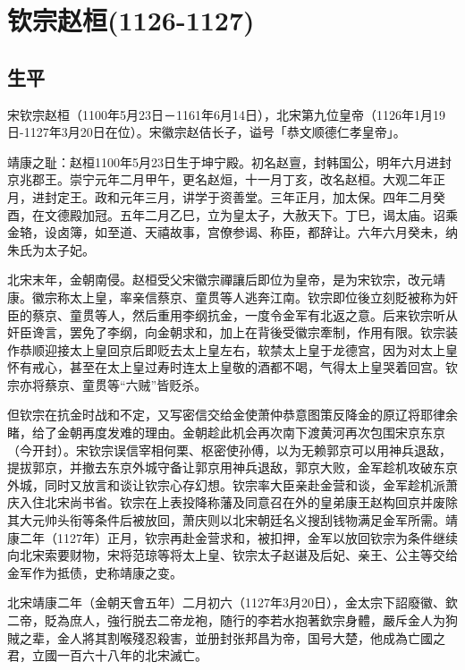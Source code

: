 
\section{钦宗赵桓\tiny(1126-1127)}

\subsection{生平}

宋钦宗赵桓（1100年5月23日－1161年6月14日），北宋第九位皇帝（1126年1月19日-1127年3月20日在位）。宋徽宗赵佶长子，谥号「恭文顺德仁孝皇帝」。

靖康之耻：赵桓1100年5月23日生于坤宁殿。初名赵亶，封韩国公，明年六月进封京兆郡王。崇宁元年二月甲午，更名赵烜，十一月丁亥，改名赵桓。大观二年正月，进封定王。政和元年三月，讲学于资善堂。三年正月，加太保。四年二月癸酉，在文德殿加冠。五年二月乙巳，立为皇太子，大赦天下。丁巳，谒太庙。诏乘金辂，设卤簿，如至道、天禧故事，宫僚参谒、称臣，都辞让。六年六月癸未，纳朱氏为太子妃。

北宋末年，金朝南侵。赵桓受父宋徽宗禪讓后即位为皇帝，是为宋钦宗，改元靖康。徽宗称太上皇，率亲信蔡京、童贯等人逃奔江南。钦宗即位後立刻貶被称为奸臣的蔡京、童贯等人，然后重用李纲抗金，一度令金军有北返之意。后来钦宗听从奸臣谗言，罢免了李纲，向金朝求和，加上在背後受徽宗牽制，作用有限。钦宗装作恭顺迎接太上皇回京后即贬去太上皇左右，软禁太上皇于龙德宫，因为对太上皇怀有戒心，甚至在太上皇过寿时连太上皇敬的酒都不喝，气得太上皇哭着回宫。钦宗亦将蔡京、童贯等“六贼”皆贬杀。

但钦宗在抗金时战和不定，又写密信交给金使萧仲恭意图策反降金的原辽将耶律余睹，给了金朝再度发难的理由。金朝趁此机会再次南下渡黄河再次包围宋京东京（今开封）。宋钦宗误信宰相何栗、枢密使孙傅，以为无赖郭京可以用神兵退敌，提拔郭京，并撤去东京外城守备让郭京用神兵退敌，郭京大败，金军趁机攻破东京外城，同时又放言和谈让钦宗心存幻想。钦宗率大臣亲赴金营和谈，金军趁机派萧庆入住北宋尚书省。钦宗在上表投降称藩及同意召在外的皇弟康王赵构回京并废除其大元帅头衔等条件后被放回，萧庆则以北宋朝廷名义搜刮钱物满足金军所需。靖康二年（1127年）正月，钦宗再赴金营求和，被扣押，金军以放回钦宗为条件继续向北宋索要财物，宋将范琼等将太上皇、钦宗太子赵谌及后妃、亲王、公主等交给金军作为抵债，史称靖康之变。

北宋靖康二年（金朝天會五年）二月初六（1127年3月20日），金太宗下詔廢徽、欽二帝，貶為庶人，強行脱去二帝龙袍，随行的李若水抱著欽宗身體，嚴斥金人为狗賊之辈，金人將其割喉殘忍殺害，並册封张邦昌为帝，国号大楚，他成為亡國之君，立國一百六十八年的北宋滅亡。

